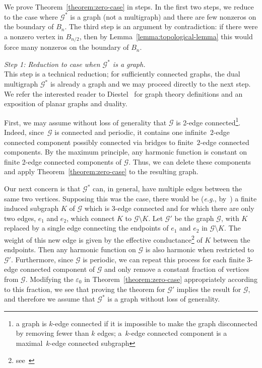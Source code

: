 \documentclass{daj}
\newcommand{\G}{\mathcal{G}}
\newcommand{\eps}{\varepsilon}
\newcommand{\eg}{{\it e.g.}}
\begin{document}
We prove Theorem~\ref{theorem:zero-case} in steps. In the first two steps, we reduce to the case where $\G^*$ is a graph (not a multigraph) and there are few nonzeros on the boundary of $B_n$. The third step is an argument by contradiction: if there were a nonzero vertex in $B_{n/2}$, then by Lemma~\ref{lemma:topological-lemma} this would force many nonzeros on the boundary of $B_{n}$.
\smallskip

{\it Step 1: Reduction to case when $\G^*$ is a graph.} \\
This step is a technical reduction; for sufficiently connected graphs, the dual multigraph $\G^*$ is already a graph and we may proceed directly to the next step. We refer the interested reader to Diestel~\cite[Section 4.6]{diestel2017graph} for graph theory definitions and an exposition of planar graphs and duality.


First, we may assume without loss of generality that $\G$ is 2-edge connected\footnote{a graph is $k$-edge connected if it is impossible to make the graph disconnected by removing fewer than $k$ edges; a~$k$-edge connected component is a maximal~$k$-edge connected subgraph}. Indeed, since~$\G$ is connected and periodic, it contains one infinite~$2$-edge connected component
possibly connected via bridges to finite~$2$-edge connected components.   
By the maximum principle, any harmonic function is constant on finite 2-edge connected components of $\G$. Thus, we can delete these components and apply Theorem~\ref{theorem:zero-case} to the resulting graph.

Our next concern is that $\G^*$ can, in general, have multiple edges between the same two vertices. Supposing this was the case, there would be (\eg, by~\cite[Proposition 4.6.2]{diestel2017graph}) a finite induced subgraph $K$ of $\G$ which is 3-edge connected
and for which there are only two edges, $e_1$ and $e_2$, which connect $K$ to $\G \setminus K$. Let $\G'$ be the graph $\G$, with $K$ replaced by a single edge connecting the endpoints of $e_1$ and $e_2$ in $\G \setminus K$. The weight of this new edge is given by the effective conductance\footnote{see~\cite[Section 3.4]{Doyle_Snell_1984}} of $K$ between the endpoints. Then any harmonic function on $\G$ is also harmonic when restricted to $\G'$. Furthermore, since $\G$ is periodic, we can repeat this process for each finite 3-edge connected component of $\G$ and only remove a constant fraction of vertices from $\G$. Modifying the $\eps_0$ in Theorem~\ref{theorem:zero-case} appropriately according to this fraction, we see that proving the theorem for $\G'$ implies the result for $\G$, and therefore we assume that $\G^*$ is a graph without loss of generality.
\smallskip
\end{document}
